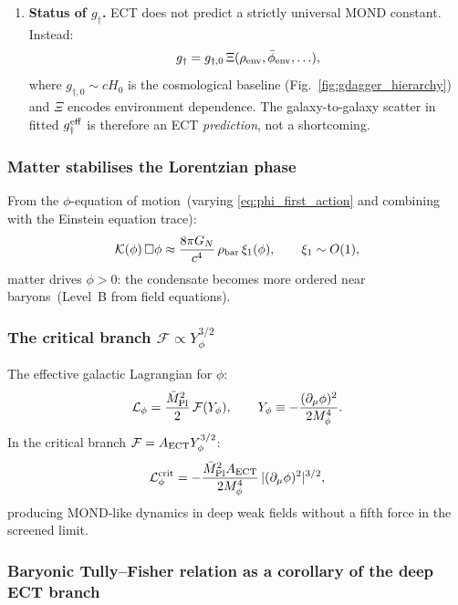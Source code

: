 \documentclass[11pt,a4paper]{article}
\numberwithin{equation}{section}
\begin{document}
\begin{enumerate}[label=(\Roman*)]
\item \textbf{Status of $g_\dagger$.}
  ECT does not predict a strictly universal MOND constant.  Instead:
  \begin{equation}
    g_\dagger = g_{\dagger,0}\,\Xi(\rho_{\rm env},\bar\phi_{\rm env},\ldots),
    \label{eq:gdagger_env_full}
  \end{equation}
  where $g_{\dagger,0}\sim cH_0$ is the cosmological baseline
  (Fig.~\ref{fig:gdagger_hierarchy}) and $\Xi$ encodes
  environment dependence.  The galaxy-to-galaxy scatter in fitted
  $g_\dagger^{\rm eff}$ is therefore an ECT \emph{prediction},
  not a shortcoming.
\end{enumerate}

\subsubsection*{Matter stabilises the Lorentzian phase}

From the $\phi$-equation of motion~(varying \eqref{eq:phi_first_action}
and combining with the Einstein equation trace):
\begin{equation}
  \label{eq:phi_eom}
  \mathcal{K}(\phi)\,\Box\phi \approx
  \frac{8\pi G_N}{c^4}\,\rho_{\rm bar}\,\xi_1(\phi),
  \qquad \xi_1\sim O(1),
\end{equation}
matter drives $\phi>0$: the condensate becomes more ordered near
baryons~(Level~B from field equations).

\subsubsection*{The critical branch $\mathcal{F}\propto Y_\phi^{3/2}$}

The effective galactic Lagrangian for $\phi$:
\begin{equation}
  \label{eq:phi_galactic}
  \mathcal{L}_\phi = \frac{\bar M_{\rm Pl}^2}{2}\,\mathcal{F}(Y_\phi),
  \qquad
  Y_\phi \equiv -\frac{(\partial_\mu\phi)^2}{2M_\phi^4}.
\end{equation}
In the critical branch $\mathcal{F}=A_{\rm ECT}Y_\phi^{3/2}$:
\begin{equation}
  \label{eq:critical_branch}
  \mathcal{L}_\phi^{\rm crit}
  = -\frac{\bar M_{\rm Pl}^2 A_{\rm ECT}}{2M_\phi^4}\,
  |(\partial_\mu\phi)^2|^{3/2},
\end{equation}
producing MOND-like dynamics in deep weak fields without a fifth force
in the screened limit.

\subsubsection*{Baryonic Tully--Fisher relation as a corollary of the deep ECT branch}
\label{sec:btfr_ect_updated}
\end{document}
